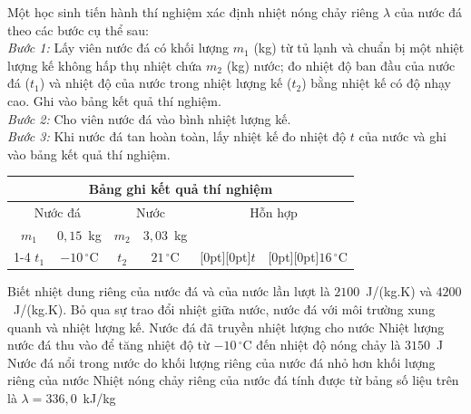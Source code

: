 	\begin{ex}%
		Một học sinh tiến hành thí nghiệm xác định nhiệt nóng chảy riêng $\lambda$ của nước đá theo các bước cụ thể sau:\\
		\textit{Bước 1:} Lấy viên nước đá có khối lượng $m_1$ (kg) từ tủ lạnh và chuẩn bị một nhiệt lượng kế không hấp thụ nhiệt chứa $m_2$ (kg) nước; đo nhiệt độ ban đầu của nước đá ($t_1$) và nhiệt độ của nước trong nhiệt lượng kế ($t_2$) bằng nhiệt kế có độ nhạy cao. Ghi vào bảng kết quả thí nghiệm.\\
		\textit{Bước 2:} Cho viên nước đá vào bình nhiệt lượng kế.\\
		\textit{Bước 3:} Khi nước đá tan hoàn toàn, lấy nhiệt kế đo nhiệt độ $t$ của nước và ghi vào bảng kết quả thí nghiệm.
		\begin{center}
			{\renewcommand{\arraystretch}{1.2}%
			\begin{tabular}{|c|c|c|c|c|c|}
				\hline
				\multicolumn{6}{|c|}{\textbf{Bảng ghi kết quả thí nghiệm}}\\
				\hline
				\multicolumn{2}{|c|}{Nước đá} & \multicolumn{2}{c|}{Nước} & \multicolumn{2}{c|}{Hỗn hợp}\\
				\hline
				$m_1$ & $0{,}15$~kg & $m_2$ & $3{,}03$~kg & & \\
				\cline{1-4}
				$t_1$ & $-10\,^\circ\text{C}$ & $t_2$ & $21\,^\circ\text{C}$ & \raisebox{1.4ex}[0pt][0pt]{$t$} & \raisebox{1.4ex}[0pt][0pt]{$16\,^\circ\text{C}$}\\
				\hline
			\end{tabular}}
		\end{center}
		Biết nhiệt dung riêng của nước đá và của nước lần lượt là $2100$~J/(kg.K) và $4200$~J/(kg.K). Bỏ qua sự trao đổi nhiệt giữa nước, nước đá với môi trường xung quanh và nhiệt lượng kế.
		\choiceTFt
		{Nước đá đã truyền nhiệt lượng cho nước}
		{\True Nhiệt lượng nước đá thu vào để tăng nhiệt độ từ $-10\,^\circ\text{C}$ đến nhiệt độ nóng chảy là $3150$~J}
		{\True Nước đá nổi trong nước do khối lượng riêng của nước đá nhỏ hơn khối lượng riêng của nước}
		{\True Nhiệt nóng chảy riêng của nước đá tính được từ bảng số liệu trên là $\lambda=336{,}0$~kJ/kg}
	\end{ex}

